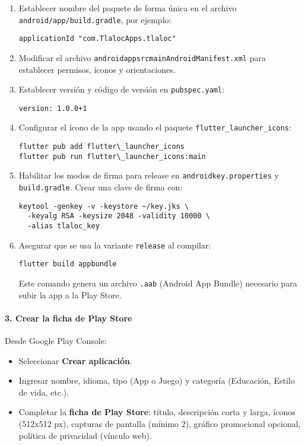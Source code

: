 \begin{enumerate}
    \item Establecer nombre del paquete de forma única en el archivo \texttt{android/app/build.gradle}, por ejemplo:
\begin{verbatim}
applicationId "com.TlalocApps.tlaloc"
\end{verbatim}

    \item Modificar el archivo \texttt{android\/app\/src\/main\/AndroidManifest.xml} para establecer permisos, íconos y orientaciones.

    \item Establecer versión y código de versión en \texttt{pubspec.yaml}:
\begin{verbatim}
version: 1.0.0+1
\end{verbatim}

    \item Configurar el ícono de la app usando el paquete \texttt{flutter\_launcher\_icons}:
\begin{verbatim}
flutter pub add flutter\_launcher_icons
flutter pub run flutter\_launcher_icons:main
\end{verbatim}

    \item Habilitar los modos de firma para release en \texttt{android\/key.properties} y \texttt{build.gradle}. Crear una clave de firma con:
\begin{verbatim}
keytool -genkey -v -keystore ~/key.jks \
  -keyalg RSA -keysize 2048 -validity 10000 \
  -alias tlaloc_key
\end{verbatim}

    \item Asegurar que se usa la variante \texttt{release} al compilar:
\begin{verbatim}
flutter build appbundle
\end{verbatim}

    Este comando genera un archivo \texttt{.aab} (Android App Bundle) necesario para subir la app a la Play Store.\cite{AndroidSigning}
\end{enumerate}

\paragraph{3. Crear la ficha de Play Store}

Desde Google Play Console:

\begin{itemize}
    \item Seleccionar \textbf{Crear aplicación}.
    \item Ingresar nombre, idioma, tipo (App o Juego) y categoría (Educación, Estilo de vida, etc.).
    \item Completar la \textbf{ficha de Play Store}: título, descripción corta y larga, íconos (512x512 px), capturas de pantalla (mínimo 2), gráfico promocional opcional, política de privacidad (vínculo web).
\end{itemize}


